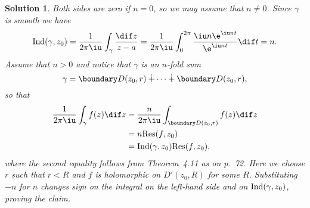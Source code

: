 \documentclass[article, a4paper, 11pt, oneside]{memoir}
\numberwithin{equation}{chapter}
\theoremstyle{nonumberplain}
\newtheorem{solution}{Solution}
\begin{document}
\begin{solution}
    Both sides are zero if $n = 0$, so we may assume that $n \neq 0$. Since $\gamma$ is smooth we have
    \begin{equation*}
        \Ind(\gamma, z_0)
            = \frac{1}{2\pi\iu} \int_{\gamma} \frac{\dif z}{z - a}
            = \frac{1}{2\pi\iu} \int_0^{2\pi} \frac{\iu n\e^{\iu nt}}{\e^{\iu nt}} \dif t
            = n.
    \end{equation*}
    Assume that $n > 0$ and notice that $\gamma$ is an $n$-fold sum
    \begin{equation*}
        \gamma
            = \boundary D(z_0,r) \mathbin{\dot{+}} \cdots \mathbin{\dot{+}} \boundary D(z_0,r),
    \end{equation*}
    so that
    \begin{align*}
        \frac{1}{2\pi\iu} \int_\gamma f(z) \dif z
            &= \frac{n}{2\pi\iu} \int_{\boundary D(z_0,r)} f(z) \dif z \\
            &= n \Res(f,z_0) \\
            &= \Ind(\gamma,z_0) \Res(f,z_0),
    \end{align*}
    where the second equality follows from Theorem~4.11 as on p.~72. Here we choose $r$ such that $r < R$ and $f$ is holomorphic on $D'(z_0,R)$ for some $R$. Substituting $-n$ for $n$ changes sign on the integral on the left-hand side and on $\mathrm{Ind}(\gamma,z_0)$, proving the claim.
\end{solution}
\end{document}
